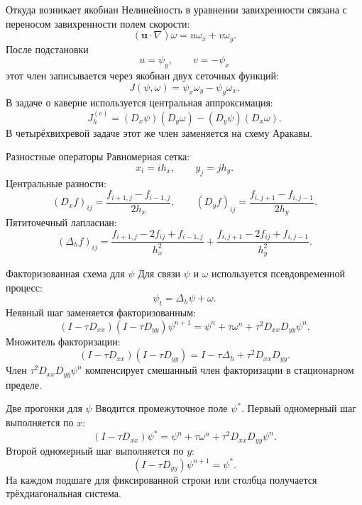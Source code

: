 \documentclass[aspectratio=169,10pt]{beamer}
\newcommand{\Laplace}{\Delta}
\newcommand{\J}{J}
\begin{document}
\begin{frame}{Откуда возникает якобиан}
    Нелинейность в уравнении завихренности связана с переносом завихренности полем скорости:
    \[
        (\mathbf u\cdot\nabla)\omega
        =
        u\omega_x+v\omega_y.
    \]
    После подстановки
    \[
        u=\psi_y,\qquad v=-\psi_x
    \]
    этот член записывается через якобиан двух сеточных функций:
    \[
        \J(\psi,\omega)
        =
        \psi_x\omega_y-\psi_y\omega_x.
    \]
    В задаче о каверне используется центральная аппроксимация:
    \[
        \J_h^{(c)}=(D_x\psi)(D_y\omega)-(D_y\psi)(D_x\omega).
    \]
    В четырёхвихревой задаче этот же член заменяется на схему Аракавы.
\end{frame}

\begin{frame}{Разностные операторы}
    Равномерная сетка:
    \[
        x_i=ih_x,\qquad y_j=jh_y.
    \]
    Центральные разности:
    \[
        (D_x f)_{ij}=\frac{f_{i+1,j}-f_{i-1,j}}{2h_x},
        \qquad
        (D_y f)_{ij}=\frac{f_{i,j+1}-f_{i,j-1}}{2h_y}.
    \]
    Пятиточечный лапласиан:
    \[
        (\Laplace_h f)_{ij}
        =
        \frac{f_{i+1,j}-2f_{ij}+f_{i-1,j}}{h_x^2}
        +
        \frac{f_{i,j+1}-2f_{ij}+f_{i,j-1}}{h_y^2}.
    \]
\end{frame}

\begin{frame}{Факторизованная схема для \(\psi\)}
    Для связи \(\psi\) и \(\omega\) используется псевдовременной процесс:
    \[
        \psi_t=\Laplace_h\psi+\omega.
    \]
    Неявный шаг заменяется факторизованным:
    \[
        (I-\tau D_{xx})(I-\tau D_{yy})\psi^{n+1}
        =
        \psi^n+\tau\omega^n+\tau^2D_{xx}D_{yy}\psi^n.
    \]
    Множитель факторизации:
    \[
        (I-\tau D_{xx})(I-\tau D_{yy})
        =
        I-\tau\Laplace_h+\tau^2D_{xx}D_{yy}.
    \]
    Член \(\tau^2D_{xx}D_{yy}\psi^n\) компенсирует смешанный член факторизации в стационарном пределе.
\end{frame}

\begin{frame}{Две прогонки для \(\psi\)}
    Вводится промежуточное поле \(\psi^*\).
    Первый одномерный шаг выполняется по \(x\):
    \[
        (I-\tau D_{xx})\psi^{*}
        =
        \psi^n+\tau\omega^n+\tau^2D_{xx}D_{yy}\psi^n.
    \]
    Второй одномерный шаг выполняется по \(y\):
    \[
        (I-\tau D_{yy})\psi^{n+1}=\psi^{*}.
    \]
    На каждом подшаге для фиксированной строки или столбца получается трёхдиагональная система.
\end{frame}
\end{document}
